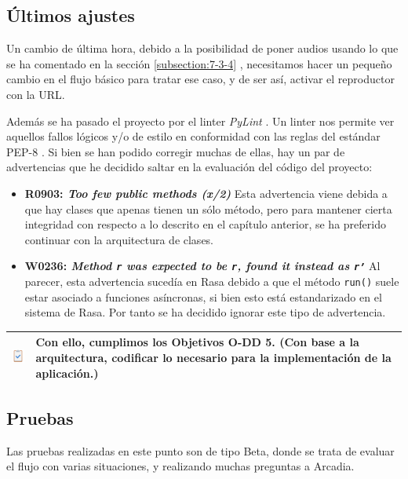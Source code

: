 \subsection{Últimos ajustes}

Un cambio de última hora, debido a la posibilidad de poner audios usando lo que se ha comentado en la sección \ref{subsection:7-3-4} , necesitamos hacer un pequeño cambio en el flujo básico para tratar ese caso, y de ser así,  activar el reproductor con la URL.

Además se ha pasado el proyecto por el linter \textit{PyLint} \cite{pylint}. Un linter nos permite ver aquellos fallos lógicos y/o de estilo en conformidad con las reglas del estándar PEP-8 \cite{pep8}. Si bien se han podido corregir muchas de ellas, hay un par de advertencias que he decidido saltar en la evaluación del código del proyecto:
\begin{itemize}
	\item \textbf{R0903: \textit{Too few public methods (x/2)}} Esta advertencia viene debida a que hay clases que apenas tienen un sólo método, pero para mantener cierta integridad con respecto a lo descrito en el capítulo anterior, se ha preferido continuar con la arquitectura de clases.
	\item \textbf{W0236: \textit{Method \texttt{r} was expected to be \texttt{r}, found it instead as \texttt{r'}}} Al parecer, esta advertencia sucedía en Rasa debido a que el método \texttt{run()} suele estar asociado a funciones asíncronas, si bien esto está estandarizado en el sistema de Rasa. Por tanto se ha decidido ignorar este tipo de advertencia.
\end{itemize}

\begin{table}[H]
	\centering
	\begin{tabularx}{\textwidth}{|>{\columncolor{mintgreen}}c>{\columncolor{mintgreen}}X|}
		\hline
		\includegraphics[width=30pt]{imagenes/Tarea_completada.png} & Con ello, cumplimos los Objetivos \textbf{O-DD 5.} (Con base a la arquitectura, codificar lo necesario para la implementación de la aplicación.) \\
		\hline
	\end{tabularx}
\end{table}

\subsection{Pruebas}
Las pruebas realizadas en este punto son de tipo Beta, donde se trata de evaluar el flujo con varias situaciones, y realizando muchas preguntas a Arcadia.

